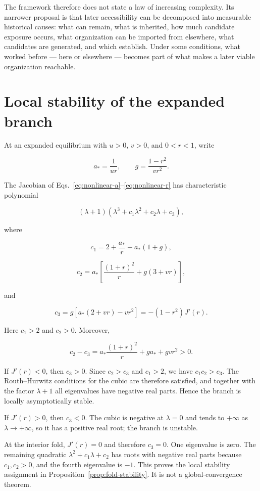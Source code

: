 \documentclass[11pt,a4paper]{article}
\begin{document}
The framework therefore does not state a law of increasing complexity. Its narrower proposal is that later accessibility can be decomposed into measurable historical causes: what can remain, what is inherited, how much candidate exposure occurs, what organization can be imported from elsewhere, what candidates are generated, and which establish. Under some conditions, what worked before --- here or elsewhere --- becomes part of what makes a later viable organization reachable.

\appendix
\section{Local stability of the expanded branch}
\label{app:stability}

At an expanded equilibrium with $u>0$, $v>0$, and $0<r<1$, write

\[
a_*=\frac{1}{ur},
\qquad
g=\frac{1-r^2}{vr^2}.
\]

The Jacobian of Eqs.~\eqref{eq:nonlinear-a}--\eqref{eq:nonlinear-r} has characteristic polynomial

\begin{equation}
(\lambda+1)\left(\lambda^3+c_1\lambda^2+c_2\lambda+c_3\right),
\label{eq:charpoly}
\end{equation}

where

\[
c_1=2+\frac{a_*}{r}+a_*(1+g),
\]

\[
c_2=a_*\left[\frac{(1+r)^2}{r}+g(3+vr)\right],
\]

and

\begin{equation}
c_3=g\left[a_*(2+vr)-vr^2\right]
=-(1-r^2)J'(r).
\label{eq:c3}
\end{equation}

Here $c_1>2$ and $c_2>0$. Moreover,

\[
c_2-c_3
=
a_*\frac{(1+r)^2}{r}+ga_*+gvr^2>0.
\]

If $J'(r)<0$, then $c_3>0$. Since $c_2>c_3$ and $c_1>2$, we have $c_1c_2>c_3$. The Routh--Hurwitz conditions for the cubic are therefore satisfied, and together with the factor $\lambda+1$ all eigenvalues have negative real parts. Hence the branch is locally asymptotically stable.

If $J'(r)>0$, then $c_3<0$. The cubic is negative at $\lambda=0$ and tends to $+\infty$ as $\lambda\to+\infty$, so it has a positive real root; the branch is unstable.

At the interior fold, $J'(r)=0$ and therefore $c_3=0$. One eigenvalue is zero. The remaining quadratic $\lambda^2+c_1\lambda+c_2$ has roots with negative real parts because $c_1,c_2>0$, and the fourth eigenvalue is $-1$. This proves the local stability assignment in Proposition~\ref{prop:fold-stability}. It is not a global-convergence theorem.

\printbibliography\printbibliography
\end{document}
